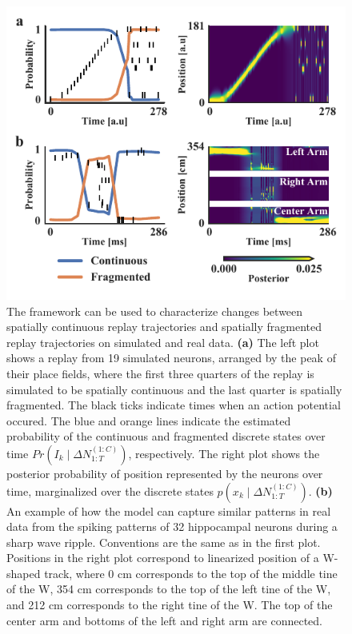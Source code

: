 \documentclass[conference]{IEEEtran}
\begin{document}
\begin{figure}[ht]
\centerline{\includegraphics{fig1.pdf}}
\caption{The framework can be used to characterize changes between spatially continuous replay trajectories and spatially fragmented replay trajectories on simulated and real data. \textbf{(a)} The left plot shows a replay from 19 simulated neurons, arranged by the peak of their place fields, where the first three quarters of the replay is simulated to be spatially continuous and the last quarter is spatially fragmented. The black ticks indicate times when an action potential occured. The blue and orange lines indicate the estimated probability of the continuous and fragmented discrete states over time $Pr(I_{k} \mid \Delta N_{1:T}^{(1:C)})$, respectively. The right plot shows the posterior probability of position represented by the neurons over time, marginalized over the discrete states $p(x_{k} \mid \Delta N_{1:T}^{(1:C)})$. \textbf{(b)} An example of how the model can capture similar patterns in real data from the spiking patterns of 32 hippocampal neurons during a sharp wave ripple. Conventions are the same as in the first plot. Positions in the right plot correspond to linearized position of a W-shaped track, where 0 cm corresponds to the top of the middle tine of the W, 354 cm corresponds to the top of the left tine of the W, and 212 cm corresponds to the right tine of the W. The top of the center arm and bottoms of the left and right arm are connected.}
\label{fig1}
\end{figure}
\end{document}
